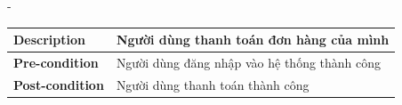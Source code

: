 \begin {list} {-}{}
\begin{itemize}
\begin{table}[H]
\begin{tabular}{|l|l|}
                \textbf{Description}      & Người dùng thanh toán đơn hàng của mình                                                                                                                                                                                                                                                                                                                                                                                                                                                                                                                                                                                                                                                                                                                                                                                                    \\ \hline
                \textbf{Pre-condition}    & Người dùng đăng nhập vào hệ thống thành công                                                                                                                                                                                                                                                                                                                                                                                                                                                                                                                                                                                                                                                                                                                                                                                               \\ \hline
                \textbf{Post-condition}   & Người dùng thanh toán thành công                                                                                                                                                                                                                                                                                                                                                                                                                                                                                                                                                                                                                                                                                                                                                                                                           \\ \hline

\end{tabular}
\end{table}
\end{itemize}
\end{list}
